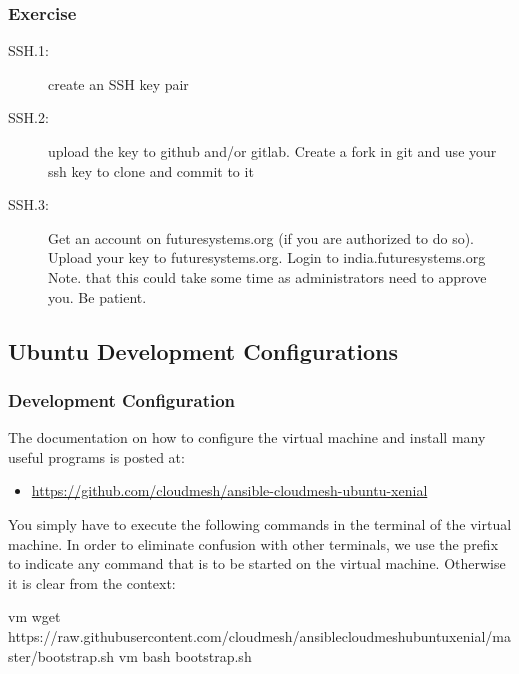 \subsubsection{Exercise}
\label{\detokenize{lesson/linux/ssh:exercise}}\begin{description}
\item[{SSH.1:}] \leavevmode
create an SSH key pair

\item[{SSH.2:}] \leavevmode
upload the key to github and/or gitlab. Create a fork in git and use
your ssh key to clone and commit to it

\item[{SSH.3:}] \leavevmode
Get an account on futuresystems.org (if you are authorized to do
so). Upload your key to futuresystems.org. Login to
india.futuresystems.org
Note. that this could take some time as administrators need to
approve you. Be patient.

\end{description}


\subsection{Ubuntu Development Configurations}
\label{\detokenize{lesson/linux/ubuntu:ubuntu-development-configurations}}\label{\detokenize{lesson/linux/ubuntu::doc}}\label{\detokenize{lesson/linux/ubuntu:vmubuntu}}

\subsubsection{Development Configuration}
\label{\detokenize{lesson/linux/ubuntu:development-configuration}}
The documentation on how to configure the virtual machine and
install many useful programs is posted at:
\begin{itemize}
\item {} 
\url{https://github.com/cloudmesh/ansible-cloudmesh-ubuntu-xenial}

\end{itemize}

You simply have to execute the following commands in the terminal of
the virtual machine. In order to eliminate confusion with other
terminals, we use the prefix  to indicate any command that is to
be started on the virtual machine. Otherwise it is clear from the
context:

\begin{sphinxVerbatim}[commandchars=\\\{\}]
vm\PYGZgt{}\PYGZdl{} wget https://raw.githubusercontent.com/cloudmesh/ansible\PYGZhy{}cloudmesh\PYGZhy{}ubuntu\PYGZhy{}xenial/master/bootstrap.sh
vm\PYGZgt{}\PYGZdl{} bash bootstrap.sh
\end{sphinxVerbatim}

